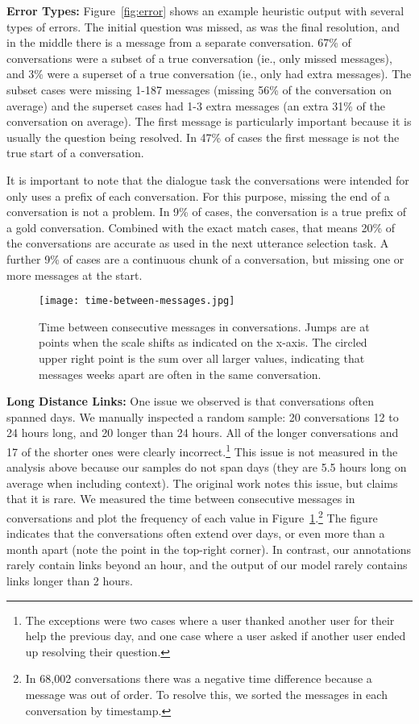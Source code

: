 \documentclass[11pt,a4paper]{article}
\newcommand{\tightparagraph}[1]{\noindent\textbf{#1:}}
\begin{document}
\tightparagraph{Error Types}
Figure~\ref{fig:error} shows an example heuristic output with several types of errors.
The initial question was missed, as was the final resolution, and in the middle there is a message from a separate conversation.
67\% of conversations were a subset of a true conversation (ie., only missed messages), and 3\% were a superset of a true conversation (ie., only had extra messages).
The subset cases were missing 1-187 messages (missing 56\% of the conversation on average) and the superset cases had 1-3 extra messages (an extra 31\% of the conversation on average).
The first message is particularly important because it is usually the question being resolved.
In 47\% of cases the first message is not the true start of a conversation.

It is important to note that the dialogue task the conversations were intended for only uses a prefix of each conversation.
For this purpose, missing the end of a conversation is not a problem.
In 9\% of cases, the conversation is a true prefix of a gold conversation.
Combined with the exact match cases, that means 20\% of the conversations are accurate as used in the next utterance selection task.
A further 9\% of cases are a continuous chunk of a conversation, but missing one or more messages at the start.

\begin{figure}
  \centering

  \texttt{[image: time-between-messages.jpg]}

  \caption{\label{fig:time-between-messages}
  Time between consecutive messages in conversations.
  Jumps are at points when the scale shifts as indicated on the x-axis.
  The circled upper right point is the sum over all larger values, indicating that messages weeks apart are often in the same conversation.
  }
\end{figure}

\tightparagraph{Long Distance Links}
One issue we observed is that conversations often spanned days.
We manually inspected a random sample: 20 conversations 12 to 24 hours long, and 20 longer than 24 hours.
All of the longer conversations and 17 of the shorter ones were clearly incorrect.\footnote{
The exceptions were two cases where a user thanked another user for their help the previous day, and one case where a user asked if another user ended up resolving their question.
}
This issue is not measured in the analysis above because our samples do not span days (they are 5.5 hours long on average when including context).
The original work notes this issue, but claims that it is rare.
We measured the time between consecutive messages in conversations and plot the frequency of each value in Figure~\ref{fig:time-between-messages}.\footnote{
  In 68,002 conversations there was a negative time difference because a message was out of order.
  To resolve this, we sorted the messages in each conversation by timestamp.
}
The figure indicates that the conversations often extend over days, or even more than a month apart (note the point in the top-right corner).
In contrast, our annotations rarely contain links beyond an hour, and the output of our model rarely contains links longer than 2 hours.
\end{document}
